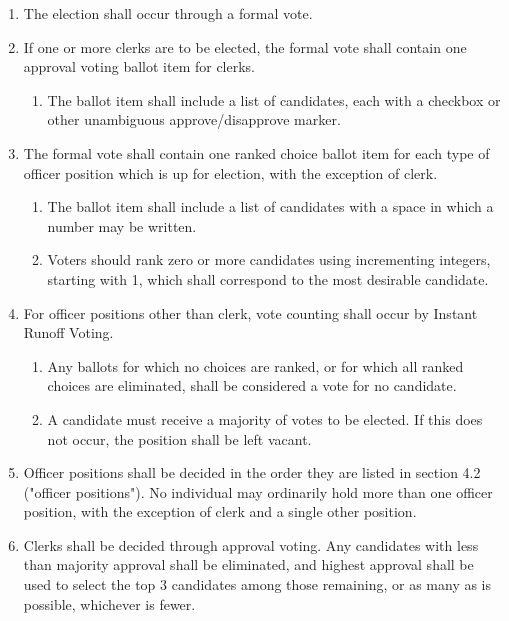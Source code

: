 \documentclass[11pt]{article}
\newcounter{h1}
\newcounter{h2}[h1]
\newcounter{h3}[h2]
\begin{document}

\begin{enumerate}
  \item The election shall occur through a formal vote.  
  \item If one or more clerks are to be elected, the formal vote shall contain one approval voting ballot item for clerks.  
  \begin{enumerate}
    \item The ballot item shall include a list of candidates, each with a checkbox or other unambiguous approve/disapprove marker.  
  \end{enumerate}
  \item The formal vote shall contain one ranked choice ballot item for each type of officer position which is up for election, with the exception of clerk.  
  \begin{enumerate}
    \item The ballot item shall include a list of candidates with a space in which a number may be written.  
    \item Voters should rank zero or more candidates using incrementing integers, starting with 1, which shall correspond to the most desirable candidate.  
  \end{enumerate}
  \item For officer positions other than clerk, vote counting shall occur by Instant Runoff Voting.  
  \begin{enumerate}
    \item Any ballots for which no choices are ranked, or for which all ranked choices are eliminated, shall be considered a vote for no candidate.  
    \item A candidate must receive a majority of votes to be elected. If this does not occur, the position shall be left vacant.  
  \end{enumerate}
  \item Officer positions shall be decided in the order they are listed in section 4.2 ("officer positions"). No individual may ordinarily hold more than one officer position, with the exception of clerk and a single other position.  
  \item Clerks shall be decided through approval voting. Any candidates with less than majority approval shall be eliminated, and highest approval shall be used to select the top 3 candidates among those remaining, or as many as is possible, whichever is fewer.
\end{enumerate}
\end{document}
